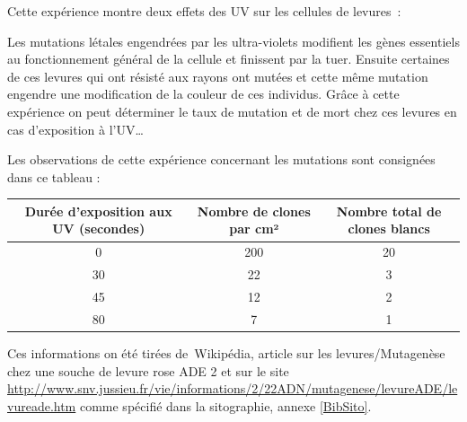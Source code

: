 Cette expérience montre deux effets des UV sur les cellules de levures :

Les mutations létales engendrées par les ultra-violets modifient les gènes essentiels au fonctionnement général de la cellule et finissent par la tuer. Ensuite certaines de ces levures qui ont résisté aux rayons ont mutées et cette même mutation engendre une modification de la couleur de ces individus. Grâce à cette expérience on peut déterminer le taux de mutation et de mort chez ces levures en cas d’exposition à l’UV…

Les observations de cette expérience concernant les mutations sont consignées dans ce tableau : 

\begin{center}
	\begin{tabular}{ c | c | c  }
	   Durée d’exposition aux UV (secondes) & Nombre de clones par cm² & Nombre total de clones blancs \\ \hline \hline
	   0 & 200 & 20 \\ \hline
	   30 & 22 & 3 \\ \hline
	   45 & 12 & 2 \\ \hline
	   80 & 7 & 1
	\end{tabular}
\end{center}

Ces informations on été tirées de Wikipédia, article sur les levures/Mutagenèse chez une souche de levure rose ADE 2 et sur le site \url{http://www.snv.jussieu.fr/vie/informations/2/22ADN/mutagenese/levureADE/levureade.htm} comme spécifié dans la sitographie, annexe \ref{BibSito}.
